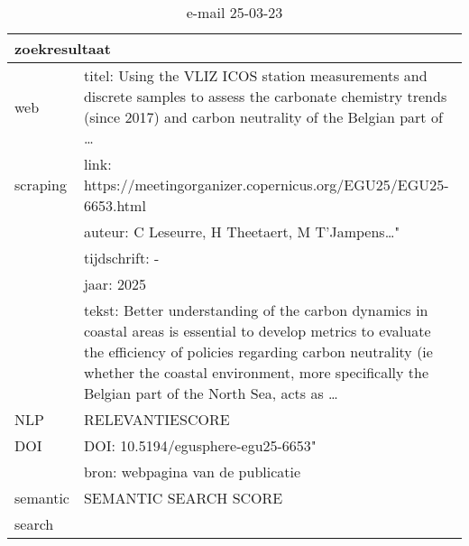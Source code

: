 \begin{table}[h!]
    \caption{e-mail 25-03-23}
    \centering
    \begin{tabularx}{\textwidth}{|p{4cm}|X|} 
        \hline
        \multicolumn{2}{|X|}{\textbf{zoekresultaat}} \\
        \hline
        web &titel: Using the VLIZ ICOS station measurements and discrete samples to assess the carbonate chemistry trends (since 2017) and carbon neutrality of the Belgian part of …\\
        scraping&link: https://meetingorganizer.copernicus.org/EGU25/EGU25-6653.html\\
        &auteur: C Leseurre, H Theetaert, M T'Jampens…"\\
        &tijdschrift: -\\
        &jaar: 2025\\
        &tekst: Better understanding of the carbon dynamics in coastal areas is essential to develop metrics to evaluate the efficiency of policies regarding carbon neutrality (ie whether the coastal environment, more specifically the Belgian part of the North Sea, acts as …\\
        \hline
        NLP&RELEVANTIESCORE\\
        \hline
        DOI&DOI: 10.5194/egusphere-egu25-6653"\\
        &bron: webpagina van de publicatie\\
        \hline
        semantic&SEMANTIC SEARCH SCORE\\
        search&\\
        \hline
    \end{tabularx}
    \label{table:email20250323}
\end{table}
